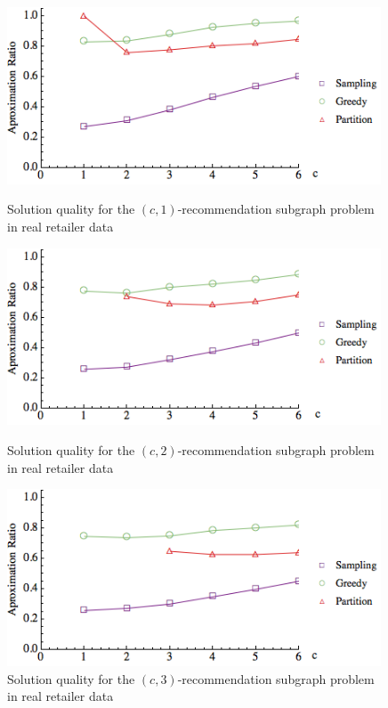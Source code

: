 \begin{figure}[h]
\centering
\begin{minipage}[h]{0.48\textwidth}
\centering
\includegraphics[width=0.99\textwidth]{images/real_a=1.png}
\caption{Solution quality for the $(c, 1)$-recommendation subgraph problem in real retailer data }\label{fig:real_a=1}
\end{minipage}

\hspace{0cm}
\begin{minipage}[h]{0.48\textwidth}
\centering
\includegraphics[width=0.99\textwidth]{images/real_a=2.png}
\caption{Solution quality for the $(c, 2)$-recommendation subgraph problem in real retailer data}\label{fig:real_a=2}
\end{minipage}

\hspace{0cm}
\begin{minipage}[h]{0.48\textwidth}
\centering
\includegraphics[width=0.99\textwidth]{images/real_a=3.png}
\caption{Solution quality for the $(c, 3)$-recommendation subgraph problem in real retailer data}\label{fig:real_a=3}
\end{minipage}
\vspace{-.7cm}
\end{figure}

